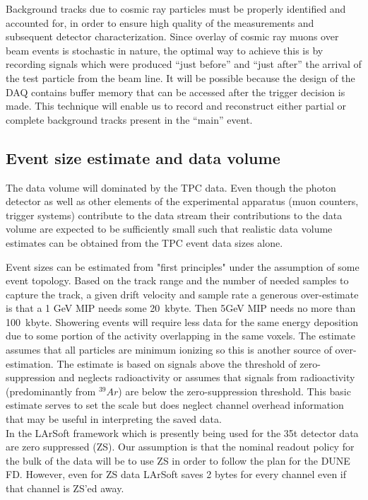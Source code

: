 Background tracks due to cosmic ray particles must be properly identified and accounted for, in order to ensure high quality of the measurements and subsequent detector characterization. Since overlay of cosmic
ray muons over beam events is stochastic in nature, the optimal way to achieve this is by recording signals which were 
produced ``just before'' and ``just after'' the arrival of the test particle from the beam line. 
It will be possible because the design of the DAQ contains buffer memory that
can be accessed after the trigger decision is made. 
This technique will enable us to record and reconstruct either partial or complete background
tracks present in the ``main'' event.


\subsection{Event size estimate and data volume}

The data volume will dominated by the TPC data. Even though the photon detector as well as  other elements of the experimental apparatus 
(muon counters, trigger systems) contribute to the data stream their contributions to the data volume are expected to be sufficiently small 
such that realistic data volume estimates can be obtained from the TPC event data sizes alone.

Event sizes  can be estimated from "first principles" under the assumption of some event topology.
Based on the track range and the number of needed samples to capture the track, a given drift velocity and sample rate
a generous over-estimate is that a 1 GeV MIP needs some 20~kbyte. Then 5GeV MIP needs no more than 100~kbyte.
Showering events will require less data for the same energy deposition
due to some portion of the activity overlapping in the same voxels.
The estimate assumes that all particles are minimum ionizing so this is
another source of over-estimation.
The estimate is based on signals above the threshold of zero-suppression and neglects
radioactivity or assumes that signals from radioactivity (predominantly from $^{39}Ar$) are below the zero-suppression threshold.
This basic estimate serves to set the scale but does neglect channel overhead information that may be useful in 
interpreting the saved data.\\

In the LArSoft framework which is presently being used for the 35t detector
data are zero suppressed (ZS). 
Our assumption is that the nominal readout policy for the bulk of the data
will be to use ZS in order to follow the plan for the DUNE FD.
However, even for 
ZS data LArSoft saves 2 bytes for every channel even if that channel is
ZS'ed away. 

